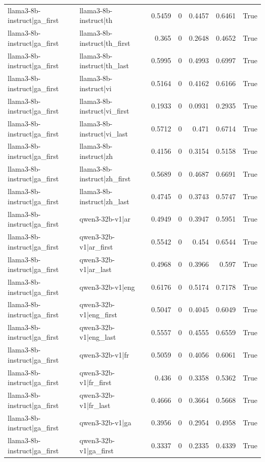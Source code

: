 \begin{table}
\begin{tabular}{l l r r r r l}
llama3-8b-instruct|ga_first & llama3-8b-instruct|th & 0.5459 & 0 & 0.4457 & 0.6461 & True \\
llama3-8b-instruct|ga_first & llama3-8b-instruct|th_first & 0.365 & 0 & 0.2648 & 0.4652 & True \\
llama3-8b-instruct|ga_first & llama3-8b-instruct|th_last & 0.5995 & 0 & 0.4993 & 0.6997 & True \\
llama3-8b-instruct|ga_first & llama3-8b-instruct|vi & 0.5164 & 0 & 0.4162 & 0.6166 & True \\
llama3-8b-instruct|ga_first & llama3-8b-instruct|vi_first & 0.1933 & 0 & 0.0931 & 0.2935 & True \\
llama3-8b-instruct|ga_first & llama3-8b-instruct|vi_last & 0.5712 & 0 & 0.471 & 0.6714 & True \\
llama3-8b-instruct|ga_first & llama3-8b-instruct|zh & 0.4156 & 0 & 0.3154 & 0.5158 & True \\
llama3-8b-instruct|ga_first & llama3-8b-instruct|zh_first & 0.5689 & 0 & 0.4687 & 0.6691 & True \\
llama3-8b-instruct|ga_first & llama3-8b-instruct|zh_last & 0.4745 & 0 & 0.3743 & 0.5747 & True \\
llama3-8b-instruct|ga_first & qwen3-32b-v1|ar & 0.4949 & 0 & 0.3947 & 0.5951 & True \\
llama3-8b-instruct|ga_first & qwen3-32b-v1|ar_first & 0.5542 & 0 & 0.454 & 0.6544 & True \\
llama3-8b-instruct|ga_first & qwen3-32b-v1|ar_last & 0.4968 & 0 & 0.3966 & 0.597 & True \\
llama3-8b-instruct|ga_first & qwen3-32b-v1|eng & 0.6176 & 0 & 0.5174 & 0.7178 & True \\
llama3-8b-instruct|ga_first & qwen3-32b-v1|eng_first & 0.5047 & 0 & 0.4045 & 0.6049 & True \\
llama3-8b-instruct|ga_first & qwen3-32b-v1|eng_last & 0.5557 & 0 & 0.4555 & 0.6559 & True \\
llama3-8b-instruct|ga_first & qwen3-32b-v1|fr & 0.5059 & 0 & 0.4056 & 0.6061 & True \\
llama3-8b-instruct|ga_first & qwen3-32b-v1|fr_first & 0.436 & 0 & 0.3358 & 0.5362 & True \\
llama3-8b-instruct|ga_first & qwen3-32b-v1|fr_last & 0.4666 & 0 & 0.3664 & 0.5668 & True \\
llama3-8b-instruct|ga_first & qwen3-32b-v1|ga & 0.3956 & 0 & 0.2954 & 0.4958 & True \\
llama3-8b-instruct|ga_first & qwen3-32b-v1|ga_first & 0.3337 & 0 & 0.2335 & 0.4339 & True \\

\end{tabular}
\end{table}
